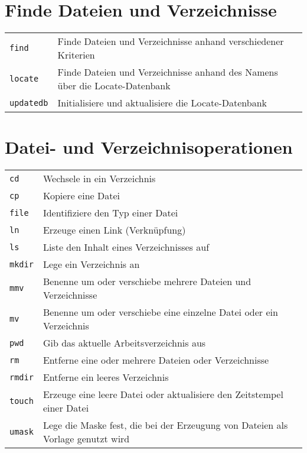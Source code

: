 \documentclass[10pt,a4paper]{article}
\begin{document}
\begin{multicols}{2}
\vfill

\section{Finde Dateien und Verzeichnisse}
\begin{tabular}{ p{2.5cm} p{8.5cm} }
  \hline
  \texttt{find} & Finde Dateien und Verzeichnisse anhand \newline verschiedener Kriterien \\
  \rowcolor{Gray}
  \texttt{locate} & Finde Dateien und Verzeichnisse anhand des Namens über die Locate-Datenbank \\
  \texttt{updatedb} & Initialisiere und aktualisiere die Locate-Datenbank \\
  \hline
\end{tabular}

\columnbreak

\section{Datei- und Verzeichnisoperationen}
\begin{tabular}{ p{2.5cm} p{8.5cm} }
  \hline
  \texttt{cd} & Wechsele in ein Verzeichnis \\
  \rowcolor{Gray}
  \texttt{cp} & Kopiere eine Datei \\
  \texttt{file} & Identifiziere den Typ einer Datei\\
  \rowcolor{Gray}
  \texttt{ln} & Erzeuge einen Link (Verknüpfung) \\
  \texttt{ls} & Liste den Inhalt eines Verzeichnisses auf \\
  \rowcolor{Gray}
  \texttt{mkdir} & Lege ein Verzeichnis an\\
  \texttt{mmv} & Benenne um oder verschiebe mehrere Dateien und Verzeichnisse \\
  \rowcolor{Gray}
  \texttt{mv} & Benenne um oder verschiebe eine einzelne Datei oder ein Verzeichnis \\
  \texttt{pwd} & Gib das aktuelle Arbeitsverzeichnis aus \\
  \rowcolor{Gray}
  \texttt{rm} & Entferne eine oder mehrere Dateien oder Verzeichnisse \\
  \texttt{rmdir} & Entferne ein leeres Verzeichnis \\
  \rowcolor{Gray}
  \texttt{touch} & Erzeuge eine leere Datei oder aktualisiere den Zeitstempel einer Datei \\
  \texttt{umask} & Lege die Maske fest, die bei der Erzeugung von Dateien als Vorlage genutzt wird \\
  \hline
\end{tabular}


\end{multicols}
\end{document}
